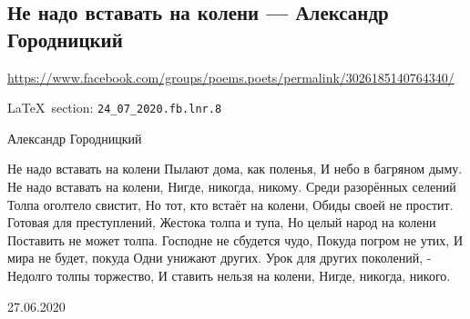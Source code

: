  
 
\subsection{Не надо вставать на колени --- Александр Городницкий}
\url{https://www.facebook.com/groups/poems.poets/permalink/3026185140764340/}
  
\vspace{0.5cm}
\LaTeX~section: \verb|24_07_2020.fb.lnr.8|
\vspace{0.5cm}

\obeycr
Александр Городницкий

Не надо вставать на колени
Пылают дома, как поленья,
И небо в багряном дыму.
Не надо вставать на колени,
Нигде, никогда, никому.
Среди разорённых селений
Толпа оголтело свистит,
Но тот, кто встаёт на колени,
Обиды своей не простит.
Готовая для преступлений,
Жестока толпа и тупа,
Но целый народ на колени
Поставить не может толпа.
Господне не сбудется чудо,
Покуда погром не утих,
И мира не будет, покуда
Одни унижают других.
Урок для других поколений, -
Недолго толпы торжество,
И ставить нельзя на колени,
Нигде, никогда, никого.

27.06.2020
\restorecr
